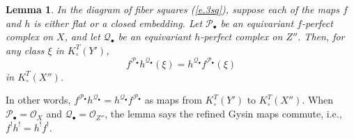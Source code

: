 \documentclass[11pt]{amsart}
\newtheorem{lemma}[theorem]{Lemma}
\theoremstyle{definition}
\begin{document}
\begin{lemma}\label{l.commutes}
In the diagram of fiber squares (\ref{e.3sq}), suppose each of the maps $f$ and $h$ is either flat or a closed embedding.  Let ${\mathscr{P}}_\bullet$ be an equivariant $f$-perfect complex on $X$, and let ${\mathscr{Q}}_\bullet$ be an equivariant $h$-perfect complex on $Z''$.  Then, for any class $\xi$ in $K^T_\circ(Y')$,
\[
  f^{{\mathscr{P}}_\bullet} h^{{\mathscr{Q}}_\bullet}(\xi) = h^{{\mathscr{Q}}_\bullet} f^{{\mathscr{P}}_\bullet}(\xi)
\]
in $K^T_\circ(X'')$.
\end{lemma}

\noindent In other words, $f^{{\mathscr{P}}_\bullet} h^{{\mathscr{Q}}_\bullet} = h^{{\mathscr{Q}}_\bullet} f^{{\mathscr{P}}_\bullet}$ as maps from $K_\circ^T(Y')$ to $K_\circ^T(X'')$.  When ${\mathscr{P}}_\bullet = {\mathcal{O}}_X$ and ${\mathscr{Q}}_\bullet = {\mathcal{O}}_{Z''}$, the lemma says the refined Gysin maps commute, i.e., $f^! h^! = h^! f^!$.
\end{document}

